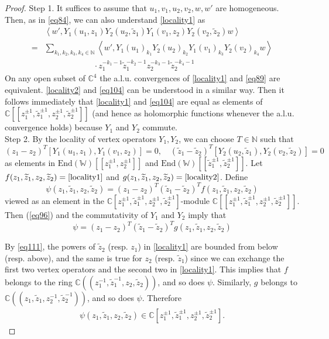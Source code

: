 \documentclass[11pt,b5paper,notitlepage]{article}
\theoremstyle{definition}
\theoremstyle{plain}
\newcommand{\wtd}{\widetilde}
\newcommand{\End}{\mathrm{End}} %
\newcommand{\Wbb}{\mathbb W}
\newcommand{\Cbb}{\mathbb C}
\newcommand{\Nbb}{\mathbb N}
\newcommand{\<}{\left\langle}
\renewcommand{\>}{\right\rangle}
\numberwithin{equation}{section}
\begin{document}
\begin{proof}

Step 1. It suffices to assume that $u_1,v_1,u_2,v_2,w,w'$ are homogeneous. Then, as in \eqref{eq84}, we can also understand \eqref{locality1} as
\begin{align}
&\<w',Y_1(u_1,z_1)Y_2(u_2,\wtd z_1)Y_1(v_1,z_2)Y_2(v_2,\wtd z_2)w\>\nonumber\\
=&\sum_{k_1,k_2,k_3,k_4\in\Nbb}\<w',Y_1(u_1)_{k_1}Y_2(u_2)_{k_2}Y_1(v_1)_{k_3}Y_2(v_2)_{k_4}w\>\nonumber\\
&\qquad\qquad\qquad\cdot z_1^{-k_1-1}\wtd z_1^{-k_2-1}z_2^{-k_3-1}\wtd z_2^{-k_4-1}  \label{eq89}
\end{align}
On any open subset of $\Cbb^4$ the a.l.u. convergences of \eqref{locality1} and \eqref{eq89} are equivalent.  \eqref{locality2} and \eqref{eq104} can be understood in a similar way. Then it follows immediately that \eqref{locality1} and \eqref{eq104} are equal as elements of $\Cbb[[z_1^{\pm 1},\wtd z_1^{\pm 1},z_2^{\pm 1},\wtd z_2^{\pm 1}]]$ (and hence as holomorphic functions whenever the a.l.u. convergence holds) because $Y_1$ and $Y_2$ commute.\\[-1ex]


Step 2. By the locality of vertex operators $Y_1,Y_2$, we can choose $T\in \Nbb$ such that 
    \begin{equation}\label{eq96}
    (z_1-z_2)^T [Y_1(u_1,z_1),Y_1(v_1,z_2)]=0,\quad (\wtd z_1-\wtd z_2)^T [Y_2(u_2,\wtd z_1),Y_2(v_2,\wtd z_2)]=0
    \end{equation}
    as elements in $\End(\Wbb)[[z_1^{\pm 1},z_2^{\pm 1}]]$ and $\End(\Wbb)[[\wtd z_1^{\pm 1},\wtd z_2^{\pm 1}]]$. Let $f(z_1,\wtd z_1,z_2,\wtd z_2)=\eqref{locality1}$ and $g(z_1,\wtd z_1,z_2,\wtd z_2)=\eqref{locality2}$. Define 
    \begin{equation}\label{locality4}
    \psi(z_1,\wtd z_1,z_2,\wtd z_2)=(z_1-z_2)^T (\wtd z_1-\wtd z_2)^T  f(z_1,\wtd z_1,z_2,\wtd z_2)
    \end{equation}
viewed as an element in the $\Cbb[z_1^{\pm 1},\wtd z_1^{\pm 1},z_2^{\pm 1},\wtd z_2^{\pm 1}]$-module $\Cbb[[z_1^{\pm 1},\wtd z_1^{\pm 1},z_2^{\pm 1},\wtd z_2^{\pm 1}]]$. Then  (\ref{eq96}) and the commutativity of $Y_1$ and $Y_2$ imply that
    $$
    \psi=(z_1-z_2)^T (\wtd z_1-\wtd z_2)^T  g(z_1,\wtd z_1,z_2,\wtd z_2)
    $$

By \eqref{eq111}, the powers of $\wtd z_2$ (resp. $z_1$) in \eqref{locality1} are bounded from below (resp. above), and the same is true for $z_2$ (resp. $\wtd z_1$) since we can exchange the first two vertex operators and the second two in \eqref{locality1}. This implies that $f$ belongs to the ring $\Cbb((z_1^{-1},\wtd z_1^{-1},z_2,\wtd z_2))$, and so does $\psi$. Similarly, $g$ belongs to $\Cbb((z_1,\wtd z_1,z_2^{-1},\wtd z_2^{-1}))$, and so does $\psi$. Therefore
\begin{gather*}
\psi(z_1,\wtd z_1,z_2,\wtd z_2) \in \Cbb[z_1^{\pm 1},\wtd z_1^{\pm 1},z_2^{\pm 1},\wtd z_2^{\pm 1}].
\end{gather*}



\end{proof}
\end{document}
